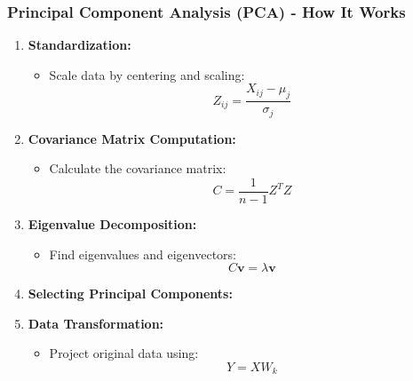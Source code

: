 \documentclass{beamer}
\begin{document}
\begin{frame}[fragile]
    \frametitle{Principal Component Analysis (PCA) - How It Works}
    \begin{enumerate}
        \item \textbf{Standardization:}
        \begin{itemize}
            \item Scale data by centering and scaling:
            \begin{equation}
            Z_{ij} = \frac{X_{ij} - \mu_j}{\sigma_j}
            \end{equation}
        \end{itemize}
        
        \item \textbf{Covariance Matrix Computation:}
        \begin{itemize}
            \item Calculate the covariance matrix:
            \begin{equation}
            C = \frac{1}{n-1} Z^T Z
            \end{equation}
        \end{itemize}
        
        \item \textbf{Eigenvalue Decomposition:}
        \begin{itemize}
            \item Find eigenvalues and eigenvectors:
            \begin{equation}
            C \mathbf{v} = \lambda \mathbf{v}
            \end{equation}
        \end{itemize}
        
        \item \textbf{Selecting Principal Components:}
        \item \textbf{Data Transformation:}
        \begin{itemize}
            \item Project original data using:
            \begin{equation}
            Y = X W_k
            \end{equation}
        \end{itemize}
    \end{enumerate}
\end{frame}
\end{document}
